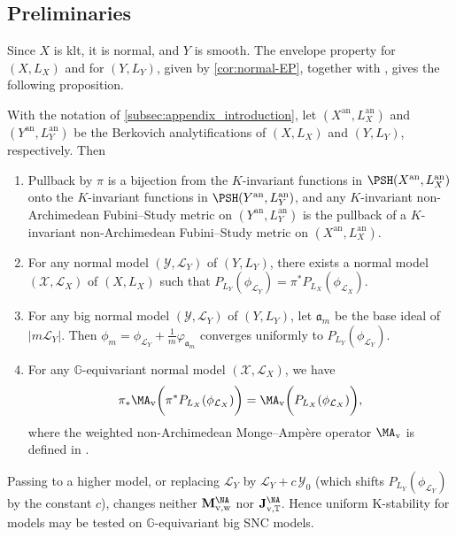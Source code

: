 \documentclass[11pt,a4paper]{article}
\newcommand{\an}{\mathrm{an}}          %
\begin{document}
\subsection{Preliminaries}\label{subsec:appendix-preliminaries}

Since $X$ is klt, it is normal, and $Y$ is smooth. The envelope property for $(X,L_X)$ and for $(Y,L_Y)$, given by \cref{cor:normal-EP}, together with \cite[Proposition~2.10, Lemma~3.4]{HL25}, gives the following proposition.
\begin{proposition}\label{prop:psh_Y_X}
    With the notation of \cref{subsec:appendix_introduction}, let $(X^\an,L_X^\an)$ and $(Y^\an,L_Y^\an)$ be the Berkovich analytifications of $(X,L_X)$ and $(Y,L_Y)$, respectively. Then
    \begin{enumerate}
        \item Pullback by $\pi$ is a bijection from the $K$-invariant functions in $\PSH(X^\an,L_X^\an)$ onto the $K$-invariant functions in $\PSH(Y^\an,L_Y^\an)$, and any $K$-invariant non-Archimedean Fubini--Study metric on $(Y^\an,L_Y^\an)$ is the pullback of a $K$-invariant non-Archimedean Fubini--Study metric on $(X^\an,L_X^\an)$. 
        \item For any normal model $(\mathcal{Y},\mathcal{L}_Y)$ of $(Y,L_Y)$, there exists a normal model $(\mathcal{X},\mathcal{L}_X)$ of $(X,L_X)$ such that $P_{L_Y}(\phi_{\mathcal{L}_Y})=\pi^*P_{L_X}(\phi_{\mathcal{L}_X})$.
        \item For any big normal model $(\mathcal{Y},\mathcal{L}_Y)$ of $(Y,L_Y)$, let $\mathfrak{a}_m$ be the base ideal of $|m\mathcal{L}_Y|$. Then $\phi_m = \phi_{\mathcal{L}_Y}+\frac{1}{m}\varphi_{\mathfrak{a}_m}$ converges uniformly to $P_{L_Y}(\phi_{\mathcal{L}_Y})$.
        \item For any $\mathbb{G}$-equivariant normal model $(\mathcal{X},\mathcal{L}_X)$,  we have
            \[
                \pi_*\MA_{\mathrm{v}}\biggl(\pi^*P_{L_X}(\phi_{\mathcal{L}_X})\biggr) = \MA_{\mathrm{v}}\biggl(P_{L_X}(\phi_{\mathcal{L}_X})\biggr),
            \]
            where the weighted non-Archimedean Monge--Ampère operator $\MA_{\mathrm{v}}$ is defined in \cite[Definition~3.1]{HL25}.
    \end{enumerate}
\end{proposition}
\begin{remark}\label{rem:big-model-stability}
Passing to a higher model, or replacing $\mathcal{L}_Y$ by $\mathcal{L}_Y+c\,\mathcal{Y}_0$ (which shifts $P_{L_Y}(\phi_{\mathcal{L}_Y})$ by the constant $c$), changes neither $\mathbf{M}^{\NA}_{\mathrm{v},\mathrm{w}}$ nor $\mathbf{J}^{\NA}_{\mathrm{v},\mathbb{T}}$. Hence uniform K-stability for models may be tested on $\mathbb{G}$-equivariant big SNC models.
\end{remark}
\end{document}
